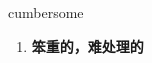 
\begin{frame}
{\huge cumbersome}
\begin{center}
\begin{enumerate}\Large
  \item \textbf{笨重的，难处理的}
\end{enumerate}
\end{center}
\end{frame}
